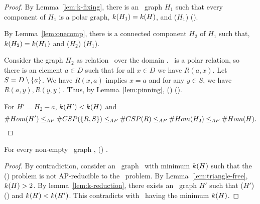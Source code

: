 \begin{proof}
By Lemma~\ref{lem:k-fixing}, there is an \RBA\ graph \(H_1\) such that
every component of \(H_1\) is a polar graph, \(k(H_1)=k(H)\), and 
\chom(\(H_1\)) \maple \chom(\mH)\@.

By Lemma~\ref{lem:onecomp}, there is a connected component \(H_2\) of \(H_1\) such that,
\(k(H_2)=k(H_1)\) and \chom(\(H_2\)) \maple \chom(\(H_1\))\@.

Consider the graph \(H_2\) as relation \mR\ over the domain \mD\@.
\mR\ is a polar relation, so there is an element \(a \in D\) such that for all \(x \in D\)
we have \(R(a, x)\)\@. Let \(S = D \setminus \{{a}\}\)\@. We have
\(R(x,a)\) implies \(x=a\) and for any \(y \in S\), we have \(R(a, y), R(y, y)\)\@.
Thus, by Lemma~\ref{lem:pinning}, \ccsp() \maple \ccsp(\mR)\@.

For \(H'=H_2 - a\), \(k(H') < k(H)\) and
\[\#Hom(H') \le_{AP} \#CSP(\{{R,S}\}) \le_{AP} \#CSP(R) \le_{AP} \#Hom(H_2) \le_{AP} \#Hom(H).\]
\end{proof}

\begin{theorem}
For every non-empty \RBA\ graph \mH, \chom(\mH) \mapge \cbis\@.
\end{theorem}


\begin{proof}
By contradiction, consider an \RBA\ graph \mH\ with minimum \(k(H)\)
such that the \chom(\mH) problem is not AP-reducible to the \cbis\ problem.
By Lemma~\ref{lem:triangle-free}, \(k(H) > 2\)\@. 
By lemma~\ref{lem:k-reduction}, there exists an \RBA\ graph \(H'\) such that 
\chom(\(H'\)) \maple \chom(\mH) and \(k(H) < k(H')\)\@.
This contradicts with \mH\ having the minimum \(k(H)\).
\end{proof}
